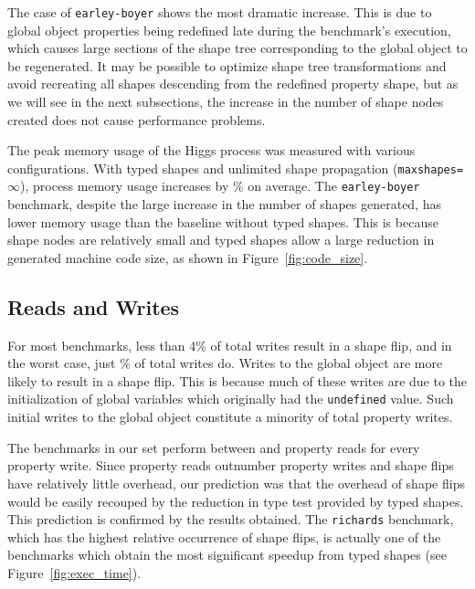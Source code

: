 \documentclass[preprint]{sigplanconf}
\newcommand{\stat}[1]{\unskip}
\newcommand{\percentstat}[1]{\unskip\%}
\begin{document}
The case of {\tt earley-boyer} shows the most dramatic increase. This is due
to global object properties being redefined late during the benchmark's
execution, which causes large sections of the shape tree corresponding to
the global object to be regenerated. It may be possible to optimize shape tree
transformations and avoid recreating all shapes descending from the redefined
property shape, but as we will see in the next subsections, the increase in
the number of shape nodes created does not cause performance problems.

The peak memory usage of the Higgs process was measured with various
configurations. With typed shapes and unlimited shape propagation
({\tt maxshapes=$\infty$}), process memory usage increases by
\percentstat{memusage_incr} on average. The {\tt earley-boyer} benchmark,
despite the large increase in the number of shapes generated, has
lower memory usage than the baseline without typed shapes. This is because
shape nodes are relatively small and typed shapes allow a large reduction
in generated machine code size, as shown in Figure~\ref{fig:code_size}.

\subsection{Reads and Writes}\label{sec:reads-writes}



For most benchmarks, less than 4\% of total writes result in a shape flip,
and in the worst case, just \percentstat{numflips_max_all_objects} of total
writes do. Writes to the global object are more likely to
result in a shape flip. This is because much of these writes are due to the
initialization of global variables which originally had the {\tt undefined}
value. Such initial writes to the global object constitute a minority of
total property writes.

The benchmarks in our set perform between \stat{readstowrites_min} and 
\stat{readstowrites_max} property reads for every property write. Since
property reads outnumber property writes and shape flips have relatively little
overhead, our prediction was that the overhead of shape flips would be easily
recouped by the reduction in type test provided by typed shapes. This
prediction is confirmed by the results obtained. The {\tt richards} benchmark,
which has the highest relative occurrence of shape flips, is actually one of
the benchmarks which obtain the most significant speedup from typed shapes
(see Figure~\ref{fig:exec_time}).
\end{document}
